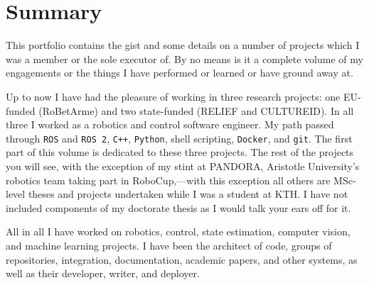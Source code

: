 \chapter{Summary}

This portfolio contains the gist and some details on a number of projects
which I was a member or the sole executor of. By no means is it a complete
volume of my engagements or the things I have performed or learned or have
ground away at.

Up to now I have had the pleasure of working in three research projects: one
EU-funded (RoBetArme) and two state-funded (RELIEF and CULTUREID). In all three
I worked as a robotics and control software engineer. My path passed through
\texttt{ROS} and \texttt{ROS 2}, \texttt{C++}, \texttt{Python}, shell
scripting, \texttt{Docker}, and \texttt{git}. The first part of this volume is
dedicated to these three projects. The rest of the projects you will see, with
the exception of my stint at PANDORA, Aristotle University's robotics team
taking part in RoboCup,---with this exception all others are MSc-level
theses and projects undertaken while I was a student at KTH. I have not
included components of my doctorate thesis as I would talk your ears off for it.

All in all I have worked on robotics, control, state estimation, computer
vision, and machine learning projects. I have been the architect of code,
groups of repositories, integration, documentation, academic papers, and other
systems, as well as their developer, writer, and deployer.
